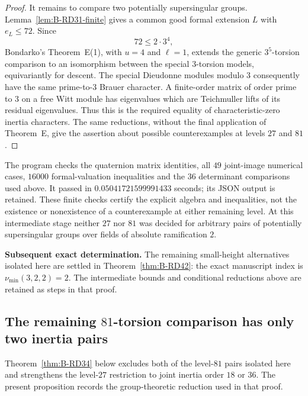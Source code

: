 \begin{proof}
It remains to compare two potentially supersingular groups.
Lemma~\ref{lem:B-RD31-finite} gives a common good formal
extension $L$ with $e_L\leq72$. Since
\[
                         72\leq2\cdot3^4,
\]
Bondarko's Theorem~E(1), with $u=4$ and $\ell=1$, extends the
generic $3^5$-torsion comparison to an isomorphism between the
special $3$-torsion models, equivariantly for descent. The
special Dieudonne modules modulo $3$ consequently have the
same prime-to-$3$ Brauer character. A finite-order matrix of
order prime to $3$ on a free Witt module has eigenvalues which
are Teichmuller lifts of its residual eigenvalues. Thus this is
the required equality of characteristic-zero inertia
characters. The same reductions, without the final application
of Theorem~E, give the assertion about possible counterexamples
at levels $27$ and $81$.
\end{proof}


\begin{remark}\label{auto:B:a26975327b26}

The program  checks the
quaternion matrix identities, all $49$ joint-image numerical cases,
$16000$ formal-valuation inequalities and the $36$ determinant
comparisons used above. It passed in $0.05041721599991433$ seconds;
its JSON output is retained. These finite checks certify the
explicit algebra and inequalities, not the existence or
nonexistence of a counterexample at either remaining level.
At this intermediate stage neither $27$ nor $81$ was decided for arbitrary pairs
of potentially supersingular groups over fields of absolute
ramification $2$.
\end{remark}

\par\smallskip\noindent\textbf{Subsequent exact determination.}
The remaining small-height alternatives isolated here are settled in
Theorem~\ref{thm:B-RD42}: the exact manuscript index is
$\nu_{\min}(3,2,2)=2$. The intermediate bounds and conditional
reductions above are retained as steps in that proof.


\subsection{The remaining $81$-torsion comparison has only two inertia pairs}

Theorem~\ref{thm:B-RD34} below excludes both of the level-$81$
pairs isolated here and strengthens the level-$27$ restriction to
joint inertia order $18$ or $36$. The present proposition records
the group-theoretic reduction used in that proof.

